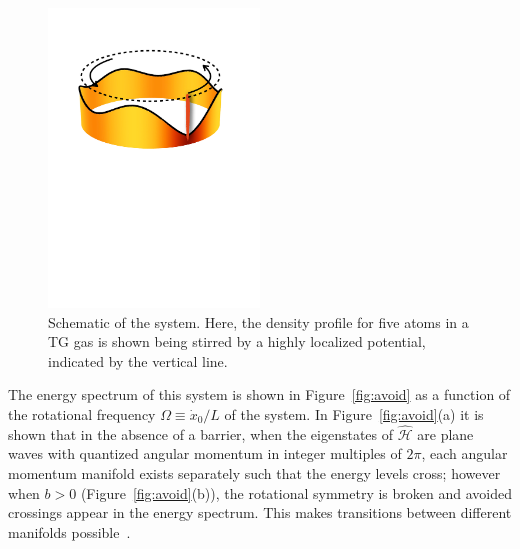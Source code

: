 \begin{figure}
\center \includegraphics[width = 0.5\textwidth]{data/1d/scheme.pdf}
\caption{Schematic of the system.
Here, the density profile for five atoms in a TG gas is shown being stirred by a highly localized potential, indicated by the vertical line.}
\label{fig:ring_scheme}
\end{figure}

The energy spectrum of this system is shown in Figure~\ref{fig:avoid} as a function of the rotational frequency $\Omega \equiv \dot x_0 /L$ of the system.
In Figure~\ref{fig:avoid}(a) it is shown that in the absence of a barrier, when the eigenstates of $\mathcal{\hat H}$ are plane waves with quantized angular momentum in integer multiples of $2 \pi$, each angular momentum manifold exists separately such that the energy levels cross; however when $b>0$ (Figure~\ref{fig:avoid}(b)), the rotational symmetry is broken and avoided crossings appear in the energy spectrum.
This makes transitions between different manifolds possible~\cite{schenke2012}.

